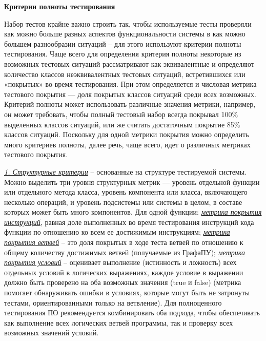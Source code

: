 
\textbf{Критерии полноты тестирования} 

Набор тестов крайне важно строить так, чтобы используемые тесты проверяли как можно больше разных аспектов функциональности системы в как можно большем разнообразии ситуаций -- для этого используют критерии полноты тестирования. Чаще всего для определения критерия полноты некоторые из возможных тестовых ситуаций рассматривают как эквивалентные и определяют количество классов неэквивалентных тестовых ситуаций, встретившихся или «покрытых» во время тестирования. При этом определяется и числовая метрика тестового покрытия — доля покрытых классов ситуаций среди всех возможных. Критерий полноты может использовать различные значения метрики, например, он может требовать, чтобы полный тестовый набор всегда покрывал 100\% выделенных классов ситуаций, или же считать достаточным покрытие 85\% классов ситуаций. Поскольку для одной метрики покрытия можно определить много критериев полноты, далее речь, чаще всего, идет о различных метриках тестового покрытия.

\underline{\textit{1. Структурные критерии}} -- основанные на структуре тестируемой системы. Можно выделить три уровня структурных метрик — уровень отдельной функции или отдельного метода класса, уровень компонента или класса, включающего несколько операций, и уровень подсистемы или системы в целом, в составе которых может быть много компонентов. Для одной функции: \underline{\textit{метрика покрытия инструкций}}, равная доле выполненных во время тестирования инструкций кода функции по отношению ко всем ее достижимым инструкциям; \underline{\textit{метрика покрытия ветвей}} -- это доля покрытых в ходе теста ветвей по отношению к общему количеству достижимых ветвей (получаемые из ГрафаПУ); \underline{\textit{метрика покрытия условий}} -- оценивает выполнение (истинность и ложность) всех отдельных условий в логических выражениях, каждое условие в выражении должно быть проверено на оба возможных значения (true и false) (метрика помогает обнаруживать ошибки в условиях, которые могут быть не затронуты тестами, ориентированными только на ветвление). Для полноценного тестирования ПО рекомендуется комбинировать оба подхода, чтобы обеспечивать как выполнение всех логических ветвей программы, так и проверку всех возможных значений условий.

